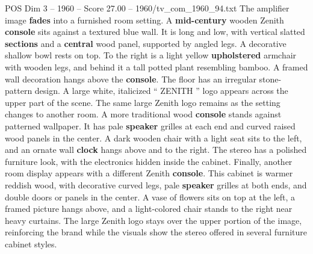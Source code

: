 \begin{textsample}{POS Dim 3 – 1960 – Score 27.00 – 1960/tv\_com\_1960\_94.txt}
The amplifier image \textbf{fades} into a furnished room setting.
A \textbf{mid-century} wooden Zenith \textbf{console} sits against a textured blue wall.
It is long and low, with vertical slatted \textbf{sections} and a \textbf{central} wood panel, supported by angled legs.
A decorative shallow bowl rests on top.
To the right is a light yellow \textbf{upholstered} armchair with wooden legs, and behind it a tall potted plant resembling bamboo.
A framed wall decoration hangs above the \textbf{console}.
The floor has an irregular stone-pattern design.
A large white, italicized “ ZENITH ” logo appears across the upper part of the scene.
The same large Zenith logo remains as the setting changes to another room.
A more traditional wood \textbf{console} stands against patterned wallpaper.
It has pale \textbf{speaker} grilles at each end and curved raised wood panels in the center.
A dark wooden chair with a light seat sits to the left, and an ornate wall \textbf{clock} hangs above and to the right.
The stereo has a polished furniture look, with the electronics hidden inside the cabinet.
Finally, another room display appears with a different Zenith \textbf{console}.
This cabinet is warmer reddish wood, with decorative curved legs, pale \textbf{speaker} grilles at both ends, and double doors or panels in the center.
A vase of flowers sits on top at the left, a framed picture hangs above, and a light-colored chair stands to the right near heavy curtains.
The large Zenith logo stays over the upper portion of the image, reinforcing the brand while the visuals show the stereo offered in several furniture cabinet styles.

\end{textsample}

